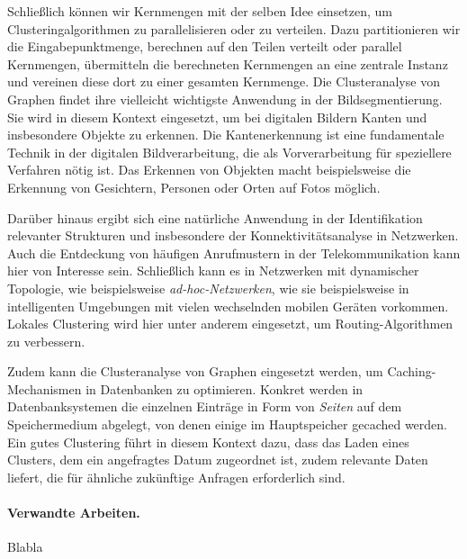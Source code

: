 Schließlich können wir Kernmengen mit der selben Idee einsetzen, um Clusteringalgorithmen zu parallelisieren oder zu verteilen.
Dazu partitionieren wir die Eingabepunktmenge, berechnen auf den Teilen verteilt oder parallel Kernmengen, übermitteln die
berechneten Kernmengen an eine zentrale Instanz und vereinen diese dort zu einer gesamten Kernmenge.
\absatz
Die Clusteranalyse von Graphen findet ihre vielleicht wichtigste Anwendung in der Bildsegmentierung. Sie wird in diesem
Kontext eingesetzt, um bei digitalen Bildern Kanten und insbesondere Objekte zu erkennen. Die Kantenerkennung ist eine
fundamentale Technik in der digitalen Bildverarbeitung, die als Vorverarbeitung für speziellere Verfahren nötig ist. Das Erkennen
von Objekten macht beispielsweise die Erkennung von Gesichtern, Personen oder Orten auf Fotos möglich.

Darüber hinaus ergibt sich eine natürliche Anwendung in der Identifikation relevanter Strukturen und insbesondere der
Konnektivitätsanalyse in Netzwerken. Auch die Entdeckung von häufigen Anrufmustern in der Telekommunikation kann hier
von Interesse sein. Schließlich kann es in Netzwerken mit dynamischer Topologie, wie beispielsweise \emph{ad-hoc-Netzwerken},
wie sie beispielsweise in intelligenten Umgebungen mit vielen wechselnden mobilen Geräten vorkommen. Lokales Clustering
wird hier unter anderem eingesetzt, um Routing-Algorithmen zu verbessern.

Zudem kann die Clusteranalyse von Graphen eingesetzt werden, um Caching-Mechanismen in Datenbanken zu optimieren.
Konkret werden in Datenbanksystemen die einzelnen Einträge in Form von \emph{Seiten} auf dem Speichermedium abgelegt,
von denen einige im Hauptspeicher gecached werden. Ein gutes Clustering führt in diesem Kontext dazu, dass das Laden eines
Clusters, dem ein angefragtes Datum zugeordnet ist, zudem relevante Daten liefert, die für ähnliche zukünftige Anfragen
erforderlich sind.


\paragraph{Verwandte Arbeiten.} Blabla